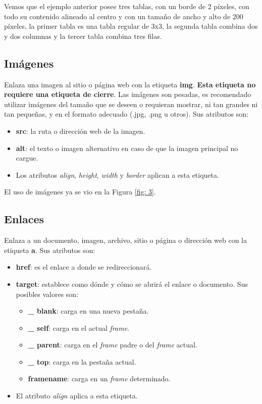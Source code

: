 Vemos que el ejemplo anterior posee tres tablas, con un borde de 2 píxeles, con todo su contenido alineado al centro y con un tamaño de ancho y alto de 200 píxeles, la primer tabla es una tabla regular de 3x3, la segunda tabla combina dos y dos columnas y la tercer tabla combina tres filas.


\subsection{Imágenes}
\hspace{0.55cm}Enlaza una imagen al sitio o página web con la etiqueta \textbf{img}. \textbf{Esta etiqueta no requiere una etiqueta de cierre}. Las imágenes son pesadas, es recomendado utilizar imágenes del tamaño que se deseen o requieran mostrar, ni tan grandes ni tan pequeñas, y en el formato adecuado (.jpg, .png u otros). Sus atributos son:
\begin{itemize}
    \item \textbf{src}: la ruta o dirección web de la imagen.
    \item \textbf{alt}: el texto o imagen alternativo en caso de que la imagen principal no cargue.
    \item Los atributos \textit{align}, \textit{height}, \textit{width} y \textit{border} aplican a esta etiqueta.
\end{itemize}

El uso de imágenes ya se vio en la Figura \ref{fig: 3}.


\subsection{Enlaces}
\hspace{0.55cm}Enlaza a un documento, imagen, archivo, sitio o página o dirección web con la etiqueta \textbf{a}. Sus atributos son:
\begin{itemize}
    \item \textbf{href}: es el enlace a donde se redireccionará.
    \item \textbf{target}: establece como dónde y cómo se abrirá el enlace o documento. Sus posibles valores son:
    \begin{itemize}
        \item \textbf{\_ blank}: carga en una nueva pestaña.
        \item \textbf{\_ self}: carga en el actual \textit{frame}.
        \item \textbf{\_ parent}: carga en el \textit{frame} padre o del \textit{frame} actual.
        \item \textbf{\_ top}: carga en la pestaña actual.
        \item \textbf{framename}: carga en un \textit{frame} determinado.
    \end{itemize}
    \item El atributo \textit{align} aplica a esta etiqueta.
\end{itemize}

